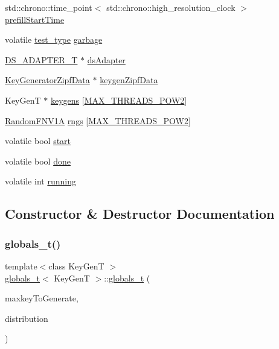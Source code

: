 \begin{DoxyCompactItemize}
\item 
std\+::chrono\+::time\+\_\+point$<$ std\+::chrono\+::high\+\_\+resolution\+\_\+clock $>$ \hyperlink{structglobals__t_ae80a96264222a4691ebec8cf56b200e5}{prefill\+Start\+Time}
\item 
volatile \hyperlink{microbench_2main_8cpp_a8c96a4eb128cbef9f7b7aa2f7533202f}{test\+\_\+type} \hyperlink{structglobals__t_ab2923d797e57d4f17d10eb0ecb8b5b3d}{garbage}
\item 
\hyperlink{microbench_2main_8cpp_ad1d56d4b6df42b94c7525e7c4559d700}{D\+S\+\_\+\+A\+D\+A\+P\+T\+E\+R\+\_\+T} $\ast$ \hyperlink{structglobals__t_a481d3a5120349414f793ac72e391a36e}{ds\+Adapter}
\item 
\hyperlink{classKeyGeneratorZipfData}{Key\+Generator\+Zipf\+Data} $\ast$ \hyperlink{structglobals__t_a38304d0125e69f6142752f3274343976}{keygen\+Zipf\+Data}
\item 
Key\+GenT $\ast$ \hyperlink{structglobals__t_a542bf0080db5994c5dca6985b37df24c}{keygens} \mbox{[}\hyperlink{plaf_8h_ac1585a3455dd3e33e877e588be9e466b}{M\+A\+X\+\_\+\+T\+H\+R\+E\+A\+D\+S\+\_\+\+P\+O\+W2}\mbox{]}
\item 
\hyperlink{classRandomFNV1A}{Random\+F\+N\+V1A} \hyperlink{structglobals__t_a4410c337060e0d0b9dd3821b2cbdf3c9}{rngs} \mbox{[}\hyperlink{plaf_8h_ac1585a3455dd3e33e877e588be9e466b}{M\+A\+X\+\_\+\+T\+H\+R\+E\+A\+D\+S\+\_\+\+P\+O\+W2}\mbox{]}
\item 
volatile bool \hyperlink{structglobals__t_a8116065e907a3ac2c87229e167ad76fd}{start}
\item 
volatile bool \hyperlink{structglobals__t_acff1b66760476ec1d523e374c616824d}{done}
\item 
volatile int \hyperlink{structglobals__t_a8d2f88e1ba5301193c217fcd2bd4e7dd}{running}
\end{DoxyCompactItemize}


\subsection{Constructor \& Destructor Documentation}
\mbox{\label{structglobals__t_a9945f1a7246ff54f3279e94036886c0d}} 
\subsubsection{\texorpdfstring{globals\+\_\+t()}{globals\_t()}}
{\footnotesize\ttfamily template$<$class Key\+GenT $>$ \\
\hyperlink{structglobals__t}{globals\+\_\+t}$<$ Key\+GenT $>$\+::\hyperlink{structglobals__t}{globals\+\_\+t} (\begin{DoxyParamCaption}\item[{size\+\_\+t}]{maxkey\+To\+Generate,  }\item[{\hyperlink{microbench_2main_8cpp_a96b004c35a7c82b13c4ac31635a5ba6a}{Key\+Generator\+Distribution}}]{distribution }\end{DoxyParamCaption})\hspace{0.3cm}{\ttfamily [inline]}}

